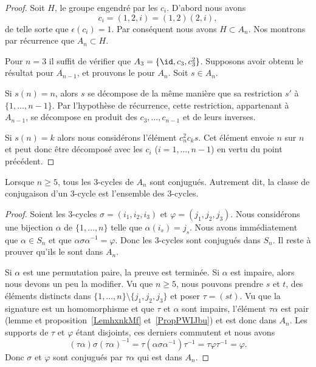 \begin{proof}
    Soit \( H\), le groupe engendré par les \( c_i\). D'abord nous avons
    \begin{equation}
        c_i=(1,2,i)=(1,2)(2,i),
    \end{equation}
    de telle sorte que \( \epsilon(c_i)=1\). Par conséquent nous avons \( H\subset A_n\). Nos montrons par récurrence que \( A_n\subset H\).

    Pour \( n=3\) il suffit de vérifier que \( A_3=\{ \id,c_3,c_3^2 \}\). Supposons avoir obtenu le résultat pour \(A_{n-1}\), et prouvons le pour \( A_n\). Soit \( s\in A_n\).

    Si \( s(n)=n\), alors \( s\) se décompose de la même manière que sa restriction \( s'\) à \( \{ 1,\ldots, n-1 \}\). Par l'hypothèse de récurrence, cette restriction, appartenant à \( A_{n-1}\),  se décompose en produit des \( c_3,\ldots, c_{n-1}\) et de leurs inverses.

    Si \( s(n)=k\) alors nous considérons l'élément \( c^2_nc_ks\). Cet élément envoie \( n\) sur \( n\) et peut donc être décomposé avec les \( c_i\) (\( i=1,\ldots, n-1\)) en vertu du point précédent.
\end{proof}

\begin{proposition} \label{PropiodtBG}
    Lorsque \( n\geq 5\), tous les \( 3\)-cycles de \( A_n\) sont conjugués. Autrement dit, la classe de conjugaison d'un \( 3\)-cycle est l'ensemble des \( 3\)-cycles.
\end{proposition}

\begin{proof}
    Soient les \( 3\)-cycles \( \sigma=(i_1,i_2,i_3)\) et \( \varphi=(j_1,j_2,j_3)\). Nous considérons une bijection \( \alpha\) de \( \{ 1,\ldots, n \}\) telle que \( \alpha(i_s)=j_s\). Nous avons immédiatement que \( \alpha\in S_n\) et que \( \alpha\sigma\alpha^{-1}=\varphi\). Donc les \( 3\)-cycles sont conjugués dans \( S_n\). Il reste à prouver qu'ils le sont dans \( A_n\).

    Si \( \alpha\) est une permutation paire, la preuve est terminée. Si \( \alpha\) est impaire, alors nous devons un peu la modifier. Vu que \( n\geq 5\), nous pouvons prendre \( s\) et \( t\), des éléments distincts dans \( \{ 1,\ldots, n \}\setminus\{ j_1,j_2,j_3 \}\) et poser \( \tau=(st)\). Vu que la signature est un homomorphisme et que \( \tau\) et \( \alpha\) sont impairs, l'élément \( \tau\alpha\) est pair (lemme et proposition~\ref{LemhxnkMf} et~\ref{PropPWIJbu}) et est donc dans \( A_n\). Les supports de \( \tau\) et \( \varphi\) étant disjoints, ces derniers commutent et nous avons
    \begin{equation}
        (\tau\alpha)\sigma(\tau\alpha)^{-1}=\tau(\alpha\sigma\alpha^{-1})\tau^{-1}=\tau\varphi\tau^{-1} = \varphi.
    \end{equation}
    Donc \( \sigma\) et \( \varphi\) sont conjugués par \( \tau\alpha\) qui est dans \( A_n\).
\end{proof}

